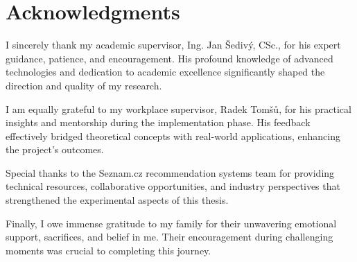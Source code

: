 
\section*{Acknowledgments}

I sincerely thank my academic supervisor, Ing. Jan Šedivý, CSc., for his expert guidance, patience, and encouragement. His profound knowledge of advanced technologies and dedication to academic excellence significantly shaped the direction and quality of my research.

I am equally grateful to my workplace supervisor, Radek Tomšů, for his practical insights and mentorship during the implementation phase. His feedback effectively bridged theoretical concepts with real-world applications, enhancing the project's outcomes.

Special thanks to the Seznam.cz recommendation systems team for providing technical resources, collaborative opportunities, and industry perspectives that strengthened the experimental aspects of this thesis.

Finally, I owe immense gratitude to my family for their unwavering emotional support, sacrifices, and belief in me. Their encouragement during challenging moments was crucial to completing this journey.

\vspace{2.5cm}
